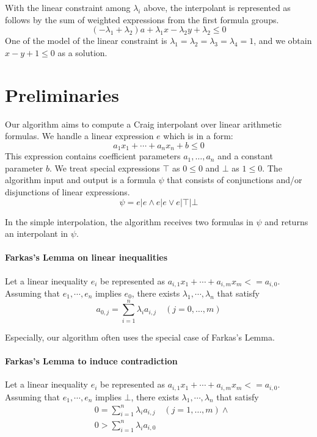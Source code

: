 With the linear constraint among $\lambda_i$ above, the interpolant is
represented as follows by the sum of weighted expressions from the
first formula groups.
\[ (- \lambda_1 + \lambda_2) a + \lambda_1 x - \lambda_2 y + \lambda_2 \leq 0 \]
One of the model of the linear constraint is $\lambda_1 = \lambda_2 =
\lambda_3 = \lambda_4 = 1$, and we obtain $x-y+1 \leq 0$ as a
solution.



\section{Preliminaries}

Our algorithm aims to compute a Craig interpolant over linear
arithmetic formulas.  We handle a linear expression $e$ which is in a
form:
\[ a_1 x_1 + \cdots + a_n x_n + b \leq 0 \]
This expression contains coefficient parameters $a_1, \ldots, a_n$ and
a constant parameter $b$.  We treat special expressions $\top$ as $0
\leq 0$ and $\bot$ as $1 \leq 0$.  The algorithm input and output is a
formula $\psi$ that consists of conjunctions and/or disjunctions of
linear expressions.
\[ \psi = e | e \wedge e | e \vee e | \top | \bot \]

In the simple interpolation, the algorithm receives two formulas in
$\psi$ and returns an interpolant in $\psi$.

\paragraph{Farkas's Lemma on linear inequalities}
Let a linear inequality $e_i$ be represented as
$a_{i,1} x_1 + \cdots + a_{i,m} x_m <= a_{i,0}$.  Assuming that
$e_1,\cdots,e_n$ implies $e_0$, there exists
$\lambda_1,\cdots,\lambda_n$ that satisfy
\[a_{0,j} = \sum_{i=1}^n \lambda_i a_{i,j} \quad (j=0, \ldots,m)\]
\vspace{10pt}

Especially, our algorithm often uses the special case of Farkas's Lemma.

\paragraph{Farkas's Lemma to induce contradiction}
Let a linear inequality $e_i$ be represented as
$a_{i,1} x_1 + \cdots + a_{i,m} x_m <= a_{i,0}$.  Assuming that
$e_1,\cdots,e_n$ implies $\bot$, there exists
$\lambda_1,\cdots,\lambda_n$ that satisfy
\begin{align*}
& 0 = \sum_{i=1}^n \lambda_i a_{i,j} \quad (j=1, \ldots, m) \wedge \\
& 0 > \sum_{i=1}^n \lambda_i a_{i,0}\
\end{align*}

